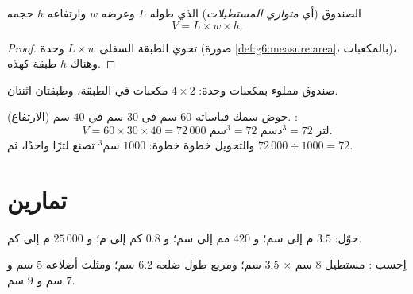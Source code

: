 \begin{proposition}\label{prop:g6:measure:box}
الصندوق (أي \emph{متوازي المستطيلات}) الذي طوله $L$ وعرضه $w$
وارتفاعه $h$ حجمه
\[
V = L \times w \times h .
\]
\end{proposition}

\begin{proof}
تحوي الطبقة السفلى $L \times w$  وحدة
(صورة \cref{def:g6:measure:area}، بالمكعبات)، وهناك $h$
طبقة كهذه.
\end{proof}

\begin{omfigure}

{\small صندوق مملوء بمكعبات وحدة: $4 \times 2$ مكعبات في الطبقة، وطبقتان
اثنتان.}
\end{omfigure}

\begin{example}\label{ex:g6:measure:aquarium}
حوض سمك قياساته $60$ سم في $30$ سم في $40$ سم (الارتفاع). :
\[
V = 60 \times 30 \times 40 = 72\,000 \text{ سم}^3 = 72 \text{ دسم}^3
= 72 \text{ لتر}.
\]
والتحويل خطوة خطوة: $1000$ سم$^3$ تصنع لترًا واحدًا،
ثم $72\,000 \div 1000 = 72$.
\end{example}

\section{تمارين}

\begin{exercise}[$\star$]\label{exo:g6:measure:1}
حوّل: $3.5$ م إلى سم؛ و $420$ مم إلى سم؛ و $0.8$ كم إلى م؛
و $25\,000$ م إلى كم.
\end{exercise}

\begin{exercise}[$\star$]\label{exo:g6:measure:2}
اِحسب : مستطيل $8$ سم $\times$ $3.5$ سم؛
ومربع طول ضلعه $6.2$ سم؛ ومثلث أضلاعه $5$ سم و $7$ سم و
$9$ سم.
\end{exercise}

